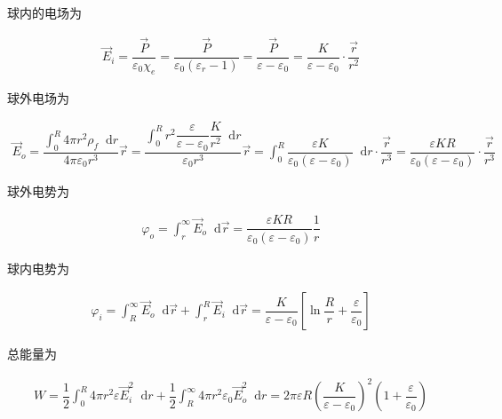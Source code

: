 \documentclass{article}
\newcommand*{\md}{\mathop{}\!\mathrm{d}}
\begin{document}
球内的电场为

\begin{equation*}
  \begin{aligned}
    \vec{E}_i = \dfrac{\vec{P}}{\varepsilon_0 \chi_e} = \dfrac{\vec{P}}{\varepsilon_0 \left( \varepsilon_r - 1 \right)} = \dfrac{\vec{P}}{\varepsilon - \varepsilon_0} 
    = \dfrac{K}{\varepsilon - \varepsilon_0} \cdot \dfrac{\vec{r}}{r^2}  
  \end{aligned}
\end{equation*}

球外电场为

\begin{equation*}
  \begin{aligned}
    \vec{E}_o = \dfrac{\int_0^R 4 \pi r^2 \rho_f \md r }{4 \pi \varepsilon_0 r^3} \vec{r}
    = \dfrac{\int_0^R r^2  \dfrac{\varepsilon}{\varepsilon - \varepsilon_0} \dfrac{K}{r^2} \md r }{\varepsilon_0 r^3} \vec{r}
    = \int_0^R   \dfrac{\varepsilon K }{\varepsilon_0 \left( \varepsilon - \varepsilon_0 \right) } \md r \cdot \dfrac{\vec{r}}{r^3} 
    = \dfrac{\varepsilon K R}{\varepsilon_0 \left( \varepsilon - \varepsilon_0 \right)} \cdot \dfrac{\vec{r}}{r^3} 
  \end{aligned}
\end{equation*}

球外电势为

\begin{equation*}
  \begin{aligned}
    \varphi_o = \int_r^{\infty} \vec{E}_o \md \vec{r} = \dfrac{\varepsilon K R}{\varepsilon_0 \left( \varepsilon - \varepsilon_0 \right)} \dfrac{1}{r}  
  \end{aligned}
\end{equation*}

球内电势为

\begin{equation*}
  \begin{aligned}
    \varphi_i = \int_R^{\infty} \vec{E}_o \md \vec{r} + \int_r^R \vec{E}_i \md \vec{r} = \dfrac{K}{\varepsilon - \varepsilon_0} \left[ \ln \dfrac{R}{r} + \dfrac{\varepsilon}{\varepsilon_0}   \right] 
  \end{aligned}
\end{equation*}

总能量为

\begin{equation*}
  \begin{aligned}
    W = \dfrac{1}{2} \int_0^R 4 \pi r^2 \varepsilon \vec{E}_i^2 \md r
    + \dfrac{1}{2} \int_R^{\infty} 4 \pi r^2 \varepsilon_0 \vec{E}_o^2 \md r
    = 2 \pi \varepsilon R \left( \dfrac{K}{\varepsilon - \varepsilon_0}  \right)^2
    \left( 1 + \dfrac{\varepsilon}{\varepsilon_0}  \right)
  \end{aligned}
\end{equation*}
\end{document}
